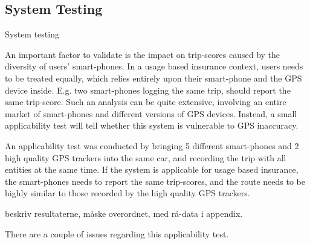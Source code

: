 \subsection{System Testing}\label{subsec:systemtesting}

System testing

An important factor to validate is the impact on trip-scores caused by the diversity of users' smart-phones. In a usage based insurance context, users needs to be treated equally, which relies entirely upon their smart-phone and the GPS device inside. E.g. two smart-phones logging the same trip, should report the same trip-score. Such an analysis can be quite extensive, involving an entire market of smart-phones and different versions of GPS devices. Instead, a small applicability test will tell whether this system is vulnerable to GPS inaccuracy. 

An applicability test was conducted by bringing 5 different smart-phones and 2 high quality GPS trackers into the same car, and recording the trip with all entities at the same time. If the system is applicable for usage based insurance, the smart-phones needs to report the same trip-scores, and the route needs to be highly similar to those recorded by the high quality GPS trackers. 

beskriv resultaterne, måske overordnet, med rå-data i appendix.

There are a couple of issues regarding this applicability test. 